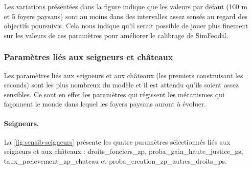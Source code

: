 Les variations présentées dans la figure indique que les valeurs par défaut (100 m et 5 foyers paysans) sont au moins dans des intervalles assez sensés au regard des objectifs poursuivis.
Cela nous indique qu'il serait possible de jouer plus finement sur les valeurs de ces paramètres pour améliorer le calibrage de SimFeodal.

\subsubsection{Paramètres liés aux seigneurs et châteaux}

Les paramètres liés aux seigneurs et aux châteaux (les premiers construisant les seconds) sont les plus nombreux du modèle et il est attendu qu'ils soient assez sensibles.
Ce sont en effet les paramètres qui régissent les mécanismes qui façonnent le monde dans lequel les foyers paysans auront à évoluer.

\paragraph{Seigneurs.}

La \cref{fig:sensib-seigneurs} présente les quatre paramètres sélectionnés liés aux seigneurs et aux châteaux :
\textsf{droits\_fonciers\_zp}, \textsf{proba\_gain\_haute\_justice\_gs}, \textsf{taux\_prelevement\_zp\_chateau} et \textsf{proba\_creation\_zp\_autres\_droits\_ps}.

